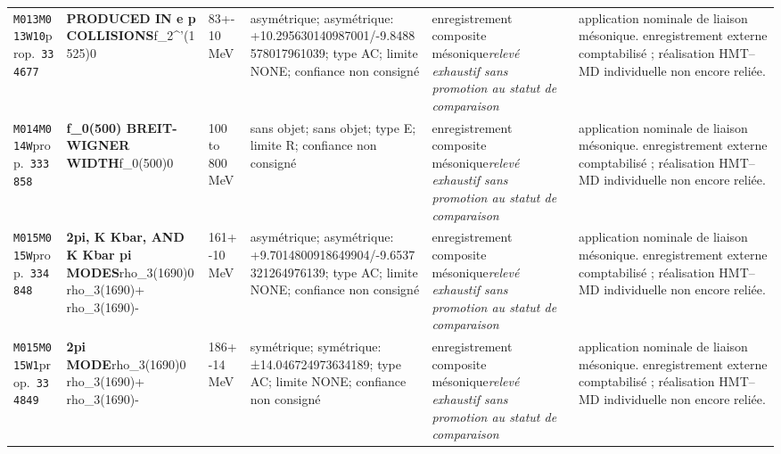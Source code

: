 \begin{landscape}
\begin{longtable}{L{1.85cm}L{4.45cm}L{2.35cm}L{4.05cm}L{3.35cm}L{7.15cm}}
\texttt{M013}\newline \texttt{M013W10}\newline prop.\ \texttt{334677} & \textbf{PRODUCED IN e p COLLISIONS}\newline f\_\allowbreak{}2\textasciicircum{}'(1525)0 & 83+-10\,MeV & asymétrique; asymétrique: +10.295630140987001/-9.8488578017961039; type AC; limite NONE; confiance non consigné & enregistrement composite mésonique\newline \emph{relevé exhaustif sans promotion au statut de comparaison} & application nominale de liaison mésonique. enregistrement externe comptabilisé ; réalisation HMT--MD individuelle non encore reliée. \\
\texttt{M014}\newline \texttt{M014W}\newline prop.\ \texttt{333858} & \textbf{f\_\allowbreak{}0(500) BREIT-WIGNER WIDTH}\newline f\_\allowbreak{}0(500)0 & 100 to 800\,MeV & sans objet; sans objet; type E; limite R; confiance non consigné & enregistrement composite mésonique\newline \emph{relevé exhaustif sans promotion au statut de comparaison} & application nominale de liaison mésonique. enregistrement externe comptabilisé ; réalisation HMT--MD individuelle non encore reliée. \\
\texttt{M015}\newline \texttt{M015W}\newline prop.\ \texttt{334848} & \textbf{2pi, K Kbar, AND K Kbar pi MODES}\newline rho\_\allowbreak{}3(1690)0 \textbar{}\allowbreak{} rho\_\allowbreak{}3(1690)+ \textbar{}\allowbreak{} rho\_\allowbreak{}3(1690)- & 161+-10\,MeV & asymétrique; asymétrique: +9.7014800918649904/-9.6537321264976139; type AC; limite NONE; confiance non consigné & enregistrement composite mésonique\newline \emph{relevé exhaustif sans promotion au statut de comparaison} & application nominale de liaison mésonique. enregistrement externe comptabilisé ; réalisation HMT--MD individuelle non encore reliée. \\
\texttt{M015}\newline \texttt{M015W1}\newline prop.\ \texttt{334849} & \textbf{2pi MODE}\newline rho\_\allowbreak{}3(1690)0 \textbar{}\allowbreak{} rho\_\allowbreak{}3(1690)+ \textbar{}\allowbreak{} rho\_\allowbreak{}3(1690)- & 186+-14\,MeV & symétrique; symétrique: ±14.046724973634189; type AC; limite NONE; confiance non consigné & enregistrement composite mésonique\newline \emph{relevé exhaustif sans promotion au statut de comparaison} & application nominale de liaison mésonique. enregistrement externe comptabilisé ; réalisation HMT--MD individuelle non encore reliée. \\

\end{longtable}
\end{landscape}

